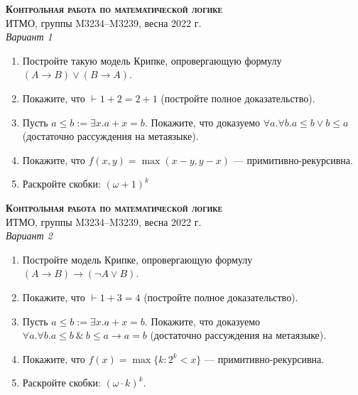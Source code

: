 \documentclass[11pt,a4paper,oneside]{scrartcl}
\begin{document}
\pagestyle{empty}

\begin{center}
{\large\scshape\bfseries Контрольная работа по математической логике}\\
ИТМО, группы M3234--M3239, весна 2022 г.\\
\itshape Вариант 1
\end{center}


\begin{enumerate}
\item Постройте такую модель Крипке, опровергающую формулу $(A \rightarrow B) \vee (B \rightarrow A)$.
\item Покажите, что $\vdash 1+2 = 2+ 1$ (постройте полное доказательство).
\item Пусть $a \le b := \exists x.a + x = b$. Покажите, что доказуемо $\forall a.\forall b.a \le b \vee b \le a$
(достаточно рассуждения на метаязыке).
\item Покажите, что $f(x,y) = \max(x-y,y-x)$ --- примитивно-рекурсивна.
\item Раскройте скобки: $(\omega + 1)^k$
\end{enumerate}

\vspace{3cm}
\begin{center}
{\large\scshape\bfseries Контрольная работа по математической логике}\\
ИТМО, группы M3234--M3239, весна 2022 г.\\
\itshape Вариант 2
\end{center}

\begin{enumerate}
\item Постройте модель Крипке, опровергающую формулу $(A \rightarrow B) \rightarrow (\neg A \vee B)$.
\item Покажите, что $\vdash 1 + 3 = 4$ (постройте полное доказательство).
\item Пусть $a \le b := \exists x.a + x = b$. Покажите, что доказуемо $\forall a.\forall b.a \le b \ \&\ b \le a \rightarrow a = b$
(достаточно рассуждения на метаязыке).
\item Покажите, что $f(x) = \max \{ k: 2^k < x \}$ --- примитивно-рекурсивна.
\item Раскройте скобки: $(\omega\cdot k)^k$.
\end{enumerate}
\end{document}
